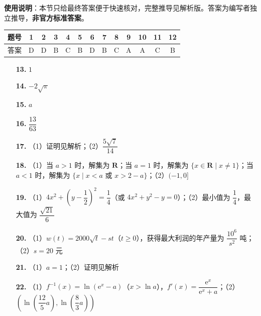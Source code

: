 
\begin{gknotice}
\textbf{使用说明}：本节只给最终答案便于快速核对，完整推导见解析版。答案为编写者独立推导，\textbf{非官方标准答案}。
\end{gknotice}

\begin{center}\begin{tabular}{ccccccccccccc}
\toprule
题号 & 1 & 2 & 3 & 4 & 5 & 6 & 7 & 8 & 9 & 10 & 11 & 12 \\
\midrule
答案 & D & D & B & C & B & D & B & C & A & A & C & B \\
\bottomrule
\end{tabular}\end{center}

\begin{itemize}[leftmargin=2.6em]
  \item[\textbf{13.}] $1$
  \item[\textbf{14.}] $-2\sqrt{\pi}$
  \item[\textbf{15.}] $a$
  \item[\textbf{16.}] $\dfrac{13}{63}$
\end{itemize}

\begin{itemize}[leftmargin=2.6em]
  \item[\textbf{17.}] （1）证明见解析；（2）$\dfrac{5\sqrt{7}}{14}$
  \item[\textbf{18.}] （1）当 $a > 1$ 时，解集为 $\mathbf{R}$；当 $a = 1$ 时，解集为 $\{x \in \mathbf{R} \mid x \neq 1\}$；当 $a < 1$ 时，解集为 $\{x \mid x < a$ 或 $x > 2-a\}$；（2）$(-1, 0]$
  \item[\textbf{19.}] （1）$4x^2 + \left(y - \dfrac{1}{2}\right)^2 = \dfrac{1}{4}$（或 $4x^2 + y^2 - y = 0$）；（2）最小值为 $\dfrac{1}{4}$，最大值为 $\dfrac{\sqrt{21}}{6}$
  \item[\textbf{20.}] （1）$w(t) = 2000\sqrt{t} - st$（$t \geqslant 0$），获得最大利润的年产量为 $\dfrac{10^6}{s^2}$ 吨；（2）$s = 20$ 元
  \item[\textbf{21.}] （1）$a = 1$；（2）证明见解析
  \item[\textbf{22.}] （1）$f^{-1}(x) = \ln(\mathrm{e}^x - a)$（$x > \ln a$），$f'(x) = \dfrac{\mathrm{e}^x}{\mathrm{e}^x + a}$；（2）$\left(\ln\left(\dfrac{12}{5}a\right), \ln\left(\dfrac{8}{3}a\right)\right)$
\end{itemize}
